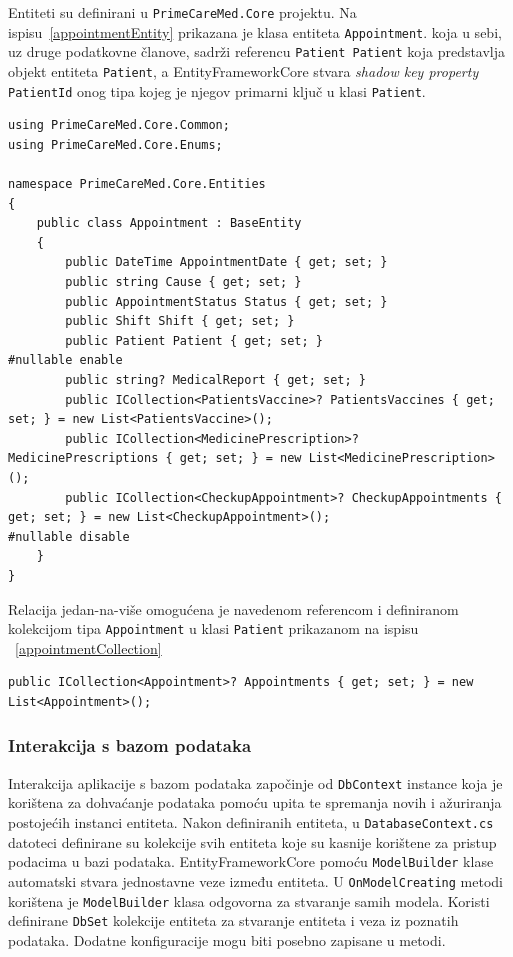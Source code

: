 Entiteti su definirani u \texttt{PrimeCareMed.Core} projektu.
Na ispisu~\ref{appointmentEntity} prikazana je klasa entiteta \texttt{Appointment}. koja u sebi, uz druge podatkovne članove, sadrži referencu \texttt{Patient Patient} koja predstavlja objekt entiteta \texttt{Patient}, a EntityFrameworkCore stvara \textit{shadow key property} \texttt{PatientId} onog tipa kojeg je njegov primarni ključ u klasi \texttt{Patient}. 
\begin{lstlisting}[caption={Entitet Appointment}, label=appointmentEntity]
using PrimeCareMed.Core.Common;
using PrimeCareMed.Core.Enums;

namespace PrimeCareMed.Core.Entities
{
    public class Appointment : BaseEntity
    {
        public DateTime AppointmentDate { get; set; }
        public string Cause { get; set; }
        public AppointmentStatus Status { get; set; }
        public Shift Shift { get; set; }
        public Patient Patient { get; set; }
#nullable enable
        public string? MedicalReport { get; set; }
        public ICollection<PatientsVaccine>? PatientsVaccines { get; set; } = new List<PatientsVaccine>();
        public ICollection<MedicinePrescription>? MedicinePrescriptions { get; set; } = new List<MedicinePrescription>();
        public ICollection<CheckupAppointment>? CheckupAppointments { get; set; } = new List<CheckupAppointment>();
#nullable disable
    }
}
\end{lstlisting}
Relacija jedan-na-više omogućena je navedenom referencom i definiranom kolekcijom tipa \texttt{Appointment} u klasi \texttt{Patient} prikazanom na ispisu ~\ref{appointmentCollection}
\begin{lstlisting}[caption={Kolekcija Appointment objekata u klasi Patient}, label=appointmentCollection]
public ICollection<Appointment>? Appointments { get; set; } = new List<Appointment>();
\end{lstlisting}

\subsubsection{Interakcija s bazom podataka}
Interakcija aplikacije s bazom podataka započinje od \texttt{DbContext} instance koja je korištena za dohvaćanje podataka pomoću upita te spremanja novih i ažuriranja postojećih instanci entiteta. Nakon definiranih entiteta, u \texttt{DatabaseContext.cs} datoteci definirane su kolekcije svih entiteta koje su kasnije korištene za pristup podacima u bazi podataka. EntityFrameworkCore pomoću \texttt{ModelBuilder} klase automatski stvara jednostavne veze između entiteta. U \texttt{OnModelCreating} metodi korištena je \texttt{ModelBuilder} klasa odgovorna za stvaranje samih modela. Koristi definirane \texttt{DbSet} kolekcije entiteta za stvaranje entiteta i veza iz poznatih podataka. Dodatne konfiguracije mogu biti posebno zapisane u metodi.

